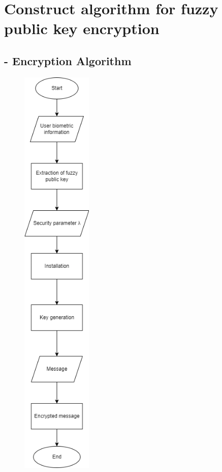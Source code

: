 \documentclass[graybox]{svmult}
\begin{document}
\section{Construct algorithm for fuzzy public key encryption}
\subsection*{- Encryption Algorithm}
\begin{figure}[H]
    \centering
    \includegraphics[width=0.3\textwidth, keepaspectratio]{Encryption.png} %
    \label{fig:encryption-algorithm}
\end{figure}
\end{document}
